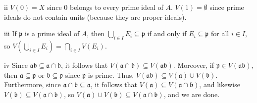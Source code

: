 \begin{partsolution}{ii}
\(V(0) = X\) since \(0\) belongs to every prime ideal of \(A\).
\(V(1) = \emptyset\) since prime ideals do not contain units (because they are proper ideals).
\end{partsolution}

\begin{partsolution}{iii}
If \(\mathfrak{p}\) is a prime ideal of \(A\), then \(\bigcup_{i \in I} E_i \subseteq \mathfrak{p}\) if and only if \(E_i \subseteq \mathfrak{p}\) for all \(i \in I\), so \(V\left(\bigcup_{i\in I} E_i\right) = \bigcap_{i\in I} V(E_i)\).
\end{partsolution}

\begin{partsolution}{iv}
Since \(\mathfrak{a} \mathfrak{b} \subseteq \mathfrak{a} \cap \mathfrak{b}\), it follows that \(V(\mathfrak{a} \cap \mathfrak{b}) \subseteq V(\mathfrak{a} \mathfrak{b})\).
Moreover, if \(\mathfrak{p} \in V(\mathfrak{a} \mathfrak{b})\), then \(\mathfrak{a} \subseteq \mathfrak{p}\) or \(\mathfrak{b} \subseteq \mathfrak{p}\) since \(\mathfrak{p}\) is prime.
Thus, \(V(\mathfrak{a} \mathfrak{b}) \subseteq V(\mathfrak{a}) \cup V(\mathfrak{b})\).
Furthermore, since \(\mathfrak{a} \cap \mathfrak{b} \subseteq \mathfrak{a}\), it follows that \(V(\mathfrak{a}) \subseteq V(\mathfrak{a} \cap \mathfrak{b})\), and likewise \(V(\mathfrak{b}) \subseteq V(\mathfrak{a} \cap \mathfrak{b})\), so \(V(\mathfrak{a}) \cup V(\mathfrak{b}) \subseteq V(\mathfrak{a} \cap \mathfrak{b})\), and we are done.
\end{partsolution}